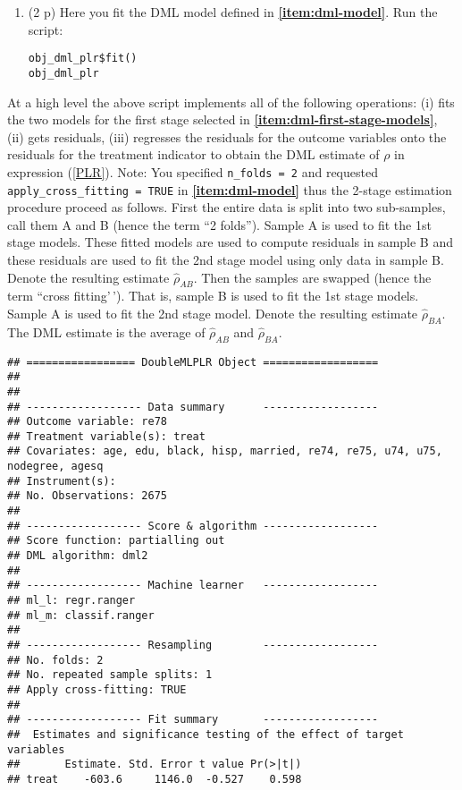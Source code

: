\documentclass[
]{article}
\newenvironment{Shaded}{\begin{snugshade}}{\end{snugshade}}
\newcommand{\FunctionTok}[1]{\textcolor[rgb]{0.13,0.29,0.53}{\textbf{#1}}}
\newcommand{\NormalTok}[1]{#1}
\newcommand{\SpecialCharTok}[1]{\textcolor[rgb]{0.81,0.36,0.00}{\textbf{#1}}}
\begin{document}
\begin{enumerate}
  \begin{enumerate}
  \def\labelenumii{\alph{enumii}.}
  \setcounter{enumii}{7}
  \item
    (2 p) Here you fit the DML model defined in
    \textbf{\ref{item:dml-model}}. Run the script:

\begin{verbatim}
obj_dml_plr$fit()
obj_dml_plr
\end{verbatim}
  \end{enumerate}

  At a high level the above script implements all of the following
  operations: (i) fits the two models for the first stage selected in
  \textbf{\ref{item:dml-first-stage-models}}, (ii) gets residuals, (iii)
  regresses the residuals for the outcome variables onto the residuals
  for the treatment indicator to obtain the DML estimate of \(\rho\) in
  expression (\ref{PLR}). Note: You specified \texttt{n\_folds = 2} and
  requested \texttt{apply\_cross\_fitting = TRUE} in
  \textbf{\ref{item:dml-model}} thus the 2-stage estimation procedure
  proceed as follows. First the entire data is split into two
  sub-samples, call them A and B (hence the term ``2 folds''). Sample A
  is used to fit the 1st stage models. These fitted models are used to
  compute residuals in sample B and these residuals are used to fit the
  2nd stage model using only data in sample B. Denote the resulting
  estimate \(\hat{\rho}_{AB}\). Then the samples are swapped (hence the
  term ``cross fitting'\,'). That is, sample B is used to fit the 1st
  stage models. Sample A is used to fit the 2nd stage model. Denote the
  resulting estimate \(\hat{\rho}_{BA}\). The DML estimate is the
  average of \(\hat{\rho}_{AB}\) and \(\hat{\rho}_{BA}\).

\begin{Shaded}
\end{Shaded}

\begin{verbatim}
## ================= DoubleMLPLR Object ==================
## 
## 
## ------------------ Data summary      ------------------
## Outcome variable: re78
## Treatment variable(s): treat
## Covariates: age, edu, black, hisp, married, re74, re75, u74, u75, nodegree, agesq
## Instrument(s): 
## No. Observations: 2675
## 
## ------------------ Score & algorithm ------------------
## Score function: partialling out
## DML algorithm: dml2
## 
## ------------------ Machine learner   ------------------
## ml_l: regr.ranger
## ml_m: classif.ranger
## 
## ------------------ Resampling        ------------------
## No. folds: 2
## No. repeated sample splits: 1
## Apply cross-fitting: TRUE
## 
## ------------------ Fit summary       ------------------
##  Estimates and significance testing of the effect of target variables
##       Estimate. Std. Error t value Pr(>|t|)
## treat    -603.6     1146.0  -0.527    0.598
\end{verbatim}


\end{enumerate}
\end{document}
